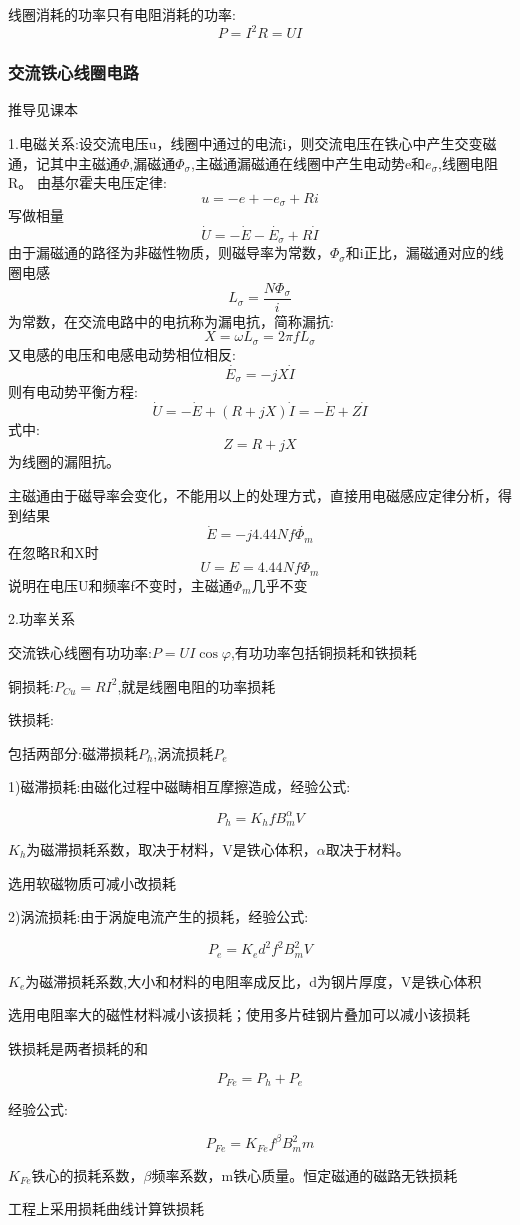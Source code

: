 \documentclass[11pt,twoside,a4paper]{ctexart}
\begin{document}
    线圈消耗的功率只有电阻消耗的功率:
    \[P = I^2R = UI \]
    \subsubsection{交流铁心线圈电路}
    推导见课本

    1.电磁关系:设交流电压u，线圈中通过的电流i，则交流电压在铁心中产生交变磁通，记其中主磁通$\varPhi  $,漏磁通$\varPhi _\sigma  $,主磁通漏磁通在线圈中产生电动势e和$e_\sigma $,线圈电阻R。
    由基尔霍夫电压定律:
    \[u = -e + -e_\sigma + Ri \]
    写做相量
    \[\dot{U} = -\dot{E} - \dot{E_\sigma} + R\dot{I} \]
    由于漏磁通的路径为非磁性物质，则磁导率为常数，$\varPhi _\sigma $和i正比，漏磁通对应的线圈电感
    \[L_\sigma = \frac{N\varPhi _\sigma}{i} \]
    为常数，在交流电路中的电抗称为漏电抗，简称漏抗:
    \[X = \omega L_\sigma = 2\pi fL_\sigma  \]
    又电感的电压和电感电动势相位相反:
    \[\dot{E_\sigma} = -jX\dot{I} \]
    则有电动势平衡方程:
    \[\dot{U} = -\dot{E} + (R + jX)\dot{I} = -\dot{E} + Z\dot{I} \]
    式中:
    \[Z = R + jX \]
    为线圈的漏阻抗。

    主磁通由于磁导率会变化，不能用以上的处理方式，直接用电磁感应定律分析，得到结果
    \[\dot{E} = -j4.44Nf\dot{\varPhi _m} \]
    在忽略R和X时
    \[U = E = 4.44Nf\varPhi _m \]
    说明在电压U和频率f不变时，主磁通$\varPhi _m $几乎不变

    2.功率关系

    交流铁心线圈有功功率:$P = UI\cos \varphi  $,有功功率包括铜损耗和铁损耗

    铜损耗:$P_{Cu} = RI^2 $,就是线圈电阻的功率损耗

    铁损耗:
    \begin{minipage}[t]{0.9\linewidth}
        包括两部分:磁滞损耗$P_h $,涡流损耗$P_e $
       
        1)磁滞损耗:由磁化过程中磁畴相互摩擦造成，经验公式:

        \[P_h = K_hfB_m^\alpha V \]

        $K_h $为磁滞损耗系数，取决于材料，V是铁心体积，$\alpha  $取决于材料。

        选用软磁物质可减小改损耗

        2)涡流损耗:由于涡旋电流产生的损耗，经验公式:

        \[P_e = K_ed^2f^2B_m^2V\]

        $K_e $为磁滞损耗系数,大小和材料的电阻率成反比，d为钢片厚度，V是铁心体积

        选用电阻率大的磁性材料减小该损耗；使用多片硅钢片叠加可以减小该损耗

        铁损耗是两者损耗的和

        \[P_{Fe} = P_h + P_e\]
        
        经验公式:

        \[P_{Fe} = K_{Fe}f^\beta B_m^2m\]

        $K_{Fe} $铁心的损耗系数，$\beta  $频率系数，m铁心质量。恒定磁通的磁路无铁损耗

        工程上采用损耗曲线计算铁损耗

    \end{minipage}
    
\end{document}
